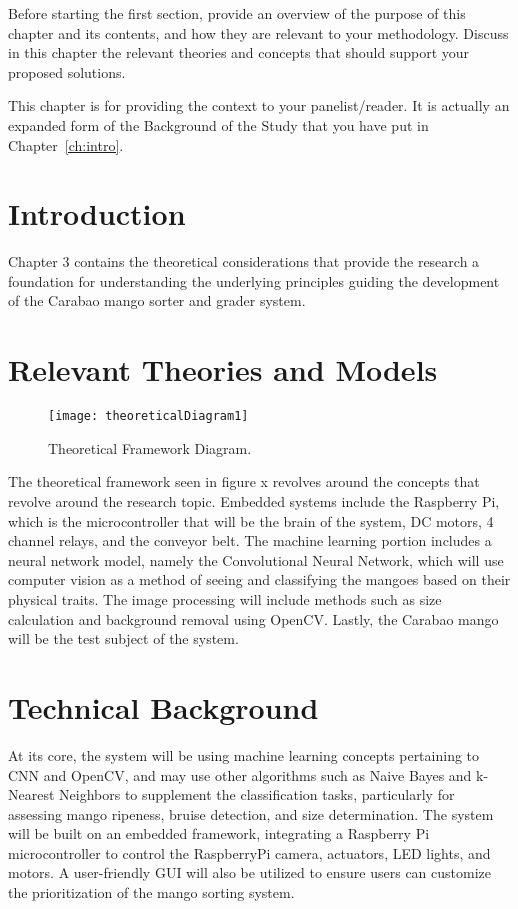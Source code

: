 Before starting the first section, provide an overview of the purpose of this chapter and its contents, and how they are relevant to your methodology.  Discuss in this chapter the relevant theories and concepts that should support your proposed solutions.

This chapter is for providing the context to your panelist/reader.  It is actually an expanded form of the Background of the Study that you have put in Chapter~\ref{ch:intro}.



\section{Introduction}

Chapter 3 contains the theoretical considerations that provide the research a foundation for understanding the underlying principles guiding the development of the Carabao mango sorter and grader system. 

\section{Relevant Theories and Models}

\begin{figure}[!htbp]
	\centering
	\texttt{[image: theoreticalDiagram1]}
	\caption{Theoretical Framework Diagram.}
	\label{fig:theoreticalDiagram1}
\end{figure}


The theoretical framework seen in figure x revolves around the concepts that revolve around the research topic. Embedded systems include the Raspberry Pi, which is the microcontroller that will be the brain of the system, DC motors, 4 channel relays, and the conveyor belt. The machine learning portion includes a neural network model, namely the Convolutional Neural Network, which will use computer vision as a method of seeing and classifying the mangoes based on their physical traits. The image processing will include methods such as size calculation and background removal using OpenCV. Lastly, the Carabao mango will be the test subject of the system.

\section{Technical Background}

At its core, the system will be using machine learning concepts pertaining to CNN and OpenCV, and may use other algorithms such as Naive Bayes and k-Nearest Neighbors to supplement the classification tasks, particularly for assessing mango ripeness, bruise detection, and size determination. The system will be built on an embedded framework, integrating a Raspberry Pi microcontroller to control the RaspberryPi camera, actuators, LED lights, and motors. A user-friendly GUI will also be utilized to ensure users can customize the prioritization of the mango sorting system.

